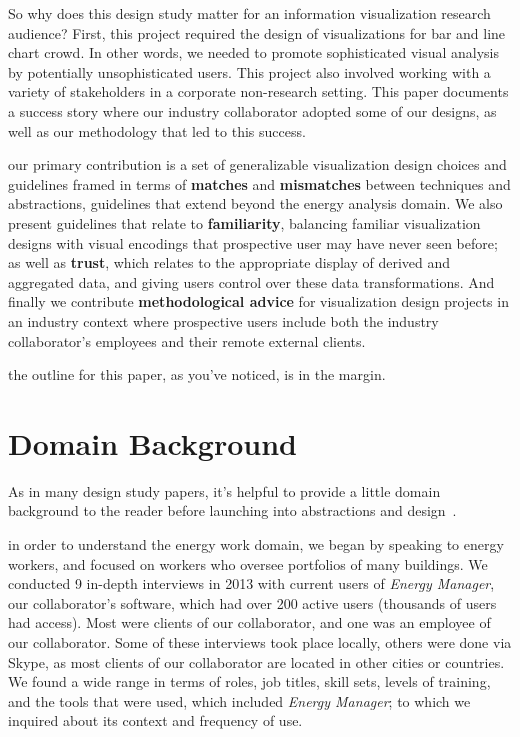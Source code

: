 \documentclass[journal]{vgtc}                %
\newcommand{\bstart}[1]{\vspace{1mm} \noindent{\textbf{#1:}}}
\begin{document}
So why does this design study matter for an information visualization research audience?
First, this project required the design of visualizations for bar and line chart crowd. 
In other words, we needed to promote sophisticated visual analysis by potentially unsophisticated users.
This project also involved working with a variety of stakeholders in a corporate non-research setting. 
This paper documents a success story where our industry collaborator adopted some of our designs, as well as our methodology that led to this success.

\bstart{Contributions} our primary contribution is a set of generalizable visualization design choices and guidelines framed in terms of {\bf matches} and {\bf mismatches} between techniques and abstractions, guidelines that extend beyond the energy analysis domain.
We also present guidelines that relate to {\bf familiarity}, balancing familiar visualization designs with visual encodings that prospective user may have never seen before; as well as {\bf trust}, which relates to the appropriate display of derived and aggregated data, and giving users control over these data transformations.
And finally we contribute {\bf methodological advice} for visualization design projects in an industry context where prospective users include both the industry collaborator's employees and their remote external clients.

\bstart{Outline} the outline for this paper, as you've noticed, is in the margin.


\section{Domain Background}
\label{domain}


As in many design study papers, it's helpful to provide a little domain background to the reader before launching into abstractions and design~\cite{Brehmer2014a,Lloyd2011,McNamara2014,Vicente1999}.

\bstart{Work domain analysis} in order to understand the energy work domain, we began by speaking to energy workers, and focused on workers who oversee portfolios of many buildings.
We conducted 9 in-depth interviews in 2013 with current users of {\it Energy Manager}, our collaborator's software, which had over 200 active users (thousands of users had access). 
Most were clients of our collaborator, and one was an employee of our collaborator. 
Some of these interviews took place locally, others were done via Skype, as most clients of our collaborator are located in other cities or countries.
We found a wide range in terms of roles, job titles, skill sets, levels of training, and the tools that were used, which included {\it Energy Manager}; to which we inquired about its context and frequency of use.
\end{document}
